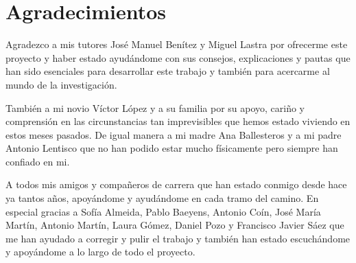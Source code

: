 

\chapter*{Agradecimientos}

Agradezco a mis tutores José Manuel Benítez y Miguel Lastra por ofrecerme este proyecto y haber estado ayudándome con sus consejos, explicaciones y pautas que han sido esenciales para desarrollar este trabajo y también para acercarme al mundo de la investigación.

También a mi novio Víctor López y a su familia por su apoyo, cariño y comprensión en las circunstancias tan imprevisibles que hemos estado viviendo en estos meses pasados. De igual manera a mi madre Ana Ballesteros y a mi padre Antonio Lentisco que no han podido estar mucho físicamente pero siempre han confiado en mi.

A todos mis amigos y compañeros de carrera que han estado conmigo desde hace ya tantos años, apoyándome y ayudándome en cada tramo del camino. En especial gracias a Sofía Almeida, Pablo Baeyens, Antonio Coín, José María Martín, Antonio Martín, Laura Gómez, Daniel Pozo y Francisco Javier Sáez que me han ayudado a corregir y pulir el trabajo y también han estado escuchándome y apoyándome a lo largo de todo el proyecto.

\endinput
